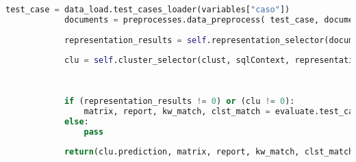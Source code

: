 \documentclass[12pt]{article}
\begin{document}
\begin{lstlisting}[language=Python, caption= Clase model]
			test_case = data_load.test_cases_loader(variables["caso"])
			documents = preprocesses.data_preprocess( test_case, documents, sc, sqlContext)
			
			representation_results = self.representation_selector(documents, represent, **variables)
			
			clu = self.cluster_selector(clust, sqlContext, representation_results, **variables)
			
			
			
			if (representation_results != 0) or (clu != 0):
				matrix, report, kw_match, clst_match = evaluate.test_case_evaluator(clu)
			else:
				pass
			
			return(clu.prediction, matrix, report, kw_match, clst_match)
		\end{lstlisting}
		
		
		
		
\end{document}
